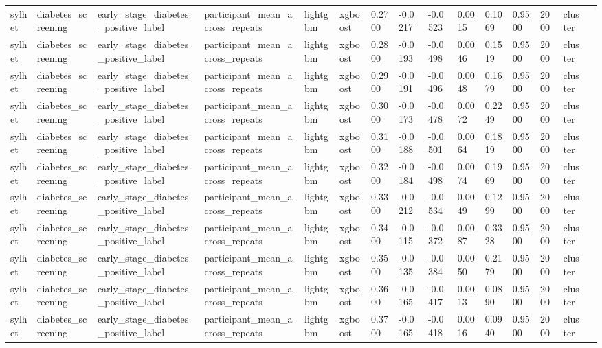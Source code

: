 \begin{tabular}{lllllllllllllll}
sylhet & diabetes\_screening & early\_stage\_diabetes\_positive\_label & participant\_mean\_across\_repeats & lightgbm & xgboost & 0.2700 & -0.0217 & -0.0523 & 0.0015 & 0.1069 & 0.9500 & 2000 & cluster &  \\
sylhet & diabetes\_screening & early\_stage\_diabetes\_positive\_label & participant\_mean\_across\_repeats & lightgbm & xgboost & 0.2800 & -0.0193 & -0.0498 & 0.0046 & 0.1519 & 0.9500 & 2000 & cluster &  \\
sylhet & diabetes\_screening & early\_stage\_diabetes\_positive\_label & participant\_mean\_across\_repeats & lightgbm & xgboost & 0.2900 & -0.0191 & -0.0496 & 0.0048 & 0.1679 & 0.9500 & 2000 & cluster &  \\
sylhet & diabetes\_screening & early\_stage\_diabetes\_positive\_label & participant\_mean\_across\_repeats & lightgbm & xgboost & 0.3000 & -0.0173 & -0.0478 & 0.0072 & 0.2249 & 0.9500 & 2000 & cluster &  \\
sylhet & diabetes\_screening & early\_stage\_diabetes\_positive\_label & participant\_mean\_across\_repeats & lightgbm & xgboost & 0.3100 & -0.0188 & -0.0501 & 0.0064 & 0.1819 & 0.9500 & 2000 & cluster &  \\
sylhet & diabetes\_screening & early\_stage\_diabetes\_positive\_label & participant\_mean\_across\_repeats & lightgbm & xgboost & 0.3200 & -0.0184 & -0.0498 & 0.0074 & 0.1969 & 0.9500 & 2000 & cluster &  \\
sylhet & diabetes\_screening & early\_stage\_diabetes\_positive\_label & participant\_mean\_across\_repeats & lightgbm & xgboost & 0.3300 & -0.0212 & -0.0534 & 0.0049 & 0.1299 & 0.9500 & 2000 & cluster &  \\
sylhet & diabetes\_screening & early\_stage\_diabetes\_positive\_label & participant\_mean\_across\_repeats & lightgbm & xgboost & 0.3400 & -0.0115 & -0.0372 & 0.0087 & 0.3328 & 0.9500 & 2000 & cluster &  \\
sylhet & diabetes\_screening & early\_stage\_diabetes\_positive\_label & participant\_mean\_across\_repeats & lightgbm & xgboost & 0.3500 & -0.0135 & -0.0384 & 0.0050 & 0.2179 & 0.9500 & 2000 & cluster &  \\
sylhet & diabetes\_screening & early\_stage\_diabetes\_positive\_label & participant\_mean\_across\_repeats & lightgbm & xgboost & 0.3600 & -0.0165 & -0.0417 & 0.0013 & 0.0890 & 0.9500 & 2000 & cluster &  \\
sylhet & diabetes\_screening & early\_stage\_diabetes\_positive\_label & participant\_mean\_across\_repeats & lightgbm & xgboost & 0.3700 & -0.0165 & -0.0418 & 0.0016 & 0.0940 & 0.9500 & 2000 & cluster &  \\

\end{tabular}
